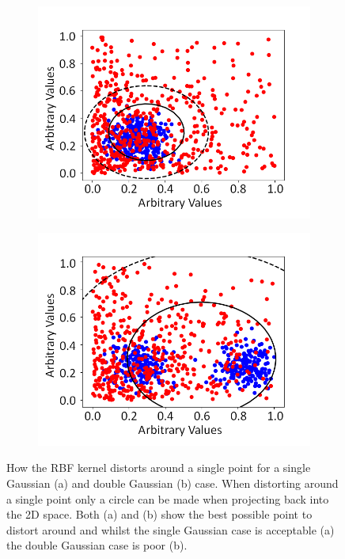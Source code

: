 \begin{figure}[!h]
\centering
\begin{subfigure}{.5\textwidth}
  \centering
  \includegraphics[width=\linewidth]{Appendix1/Figs/singleGaussExp_RbfPointDistortion.png}
  \captionsetup{width=.9\linewidth}
  \caption{}
  \label{subFig:singleGuassPointDist}
\end{subfigure}%
\begin{subfigure}{.5\textwidth}
  \centering
\includegraphics[width=\linewidth]{Appendix1/Figs/doubleGaussExp_RbfPointDistortion.png}
  \captionsetup{width=.9\linewidth}
  \caption{}
  \label{subFig:doubleGaussPointDist}
\end{subfigure}
\caption{How the RBF kernel distorts around a single point for a single Gaussian (a) and double Gaussian (b) case. When distorting around a single point only a circle can be made when projecting back into the 2D space. Both (a) and (b) show the best possible point to distort around and whilst the single Gaussian case is acceptable (a) the double Gaussian case is poor (b). }
\label{fig:GuassPointDist}
\end{figure}


